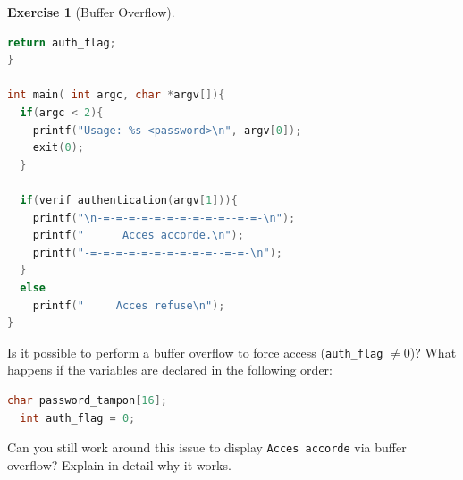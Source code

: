 \documentclass[a4paper,11pt]{article}
\theoremstyle{plain}
\theoremstyle{definition}
\newtheorem{exercice}{Exercise}
\begin{document}
\begin{exercice}[Buffer Overflow]
\begin{enumerate}
\begin{lstlisting}[language=C]
  return auth_flag;
}

int main( int argc, char *argv[]){
  if(argc < 2){
    printf("Usage: %s <password>\n", argv[0]);
    exit(0);
  }

  if(verif_authentication(argv[1])){
    printf("\n-=-=-=-=-=-=-=-=-=-=--=-=-\n");
    printf("      Acces accorde.\n");
    printf("-=-=-=-=-=-=-=-=-=-=--=-=-\n");
  }
  else
    printf("     Acces refuse\n");
}
\end{lstlisting}
Is it possible to perform a buffer overflow to force access (\texttt{auth\_flag} $\neq 0$)? What happens if the variables are declared in the following order:
\begin{lstlisting}[language=C,numbers=none]
  char password_tampon[16];
  int auth_flag = 0;
\end{lstlisting}
Can you still work around this issue to display \texttt{Acces accorde} via buffer overflow? Explain in detail why it works.
\end{enumerate}
\end{exercice}
\end{document}
